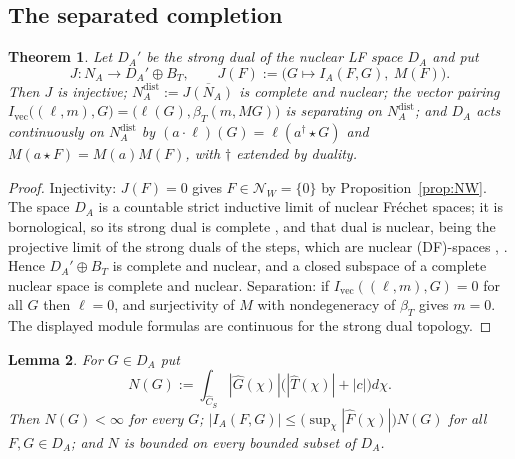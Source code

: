 \documentclass[11pt]{amsart}
\newtheorem{theorem}{Theorem}[section]
\newtheorem{lemma}[theorem]{Lemma}
\theoremstyle{definition}
\theoremstyle{remark}
\newcommand{\Th}{\widehat{T}}
\newcommand{\Ch}{\widehat{C}_S}
\newcommand{\DA}{D_A}
\newcommand{\Nrad}{\mathcal N}
\newcommand{\BT}{B_T}
\newcommand{\NAd}{N_A^{\mathrm{dist}}}
\begin{document}
\subsection{The separated completion}

\begin{theorem}\label{thm:completion}
Let $\DA'$ be the strong dual of the nuclear LF space $\DA$ and put
\begin{equation}\label{eq:J}
J:N_A\longrightarrow\DA'\oplus\BT,\qquad
J(F):=\bigl(G\mapsto I_A(F,G),\ M(F)\bigr).
\end{equation}
Then $J$ is injective; $\NAd:=\overline{J(N_A)}$ is complete and nuclear; the
vector pairing $I_{\mathrm{vec}}\bigl((\ell,m),G\bigr)=
\bigl(\ell(G),\beta_T(m,MG)\bigr)$ is separating on $\NAd$; and $\DA$ acts
continuously on $\NAd$ by $(a\cdot\ell)(G)=\ell(a^{\dagger}\star G)$ and
$M(a\star F)=M(a)M(F)$, with $\dagger$ extended by duality.
\end{theorem}

\begin{proof}
Injectivity: $J(F)=0$ gives $F\in\Nrad_W=\{0\}$ by
Proposition~\ref{prop:NW}.  The space $\DA$ is a countable strict inductive
limit of nuclear Fr\'echet spaces; it is bornological, so its strong dual is
complete \cite[IV.6.1, Cor.~1]{Schaefer}, and that dual is nuclear, being the
projective limit of the strong duals of the steps, which are nuclear
(DF)-spaces \cite[III.7.4 and IV.9.6]{Schaefer}, \cite[Prop.~50.6]{Treves}.
Hence $\DA'\oplus\BT$ is complete and nuclear, and a closed subspace of a
complete nuclear space is complete and nuclear.  Separation: if $I_{\mathrm{vec}}((\ell,m),G)=0$ for all
$G$ then $\ell=0$, and surjectivity of $M$ with nondegeneracy of $\beta_T$
gives $m=0$.  The displayed module formulas are continuous for the strong dual
topology.
\end{proof}

\begin{lemma}\label{lem:Nseminorm}
For $G\in\DA$ put
\begin{equation}\label{eq:Nsemi}
N(G):=\int_{\Ch}|\widehat G(\chi)|\bigl(|\Th(\chi)|+|c|\bigr)d\chi .
\end{equation}
Then $N(G)<\infty$ for every $G$; $|I_A(F,G)|\le
\bigl(\sup_{\chi}|\widehat F(\chi)|\bigr)N(G)$ for all $F,G\in\DA$; and $N$ is
bounded on every bounded subset of $\DA$.
\end{lemma}
\end{document}
